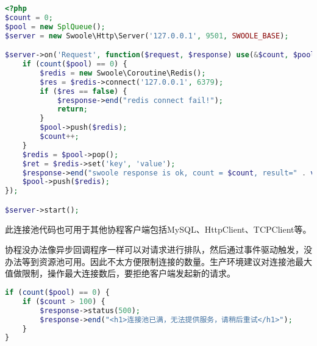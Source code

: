 \begin{lstlisting}[language=PHP]
<?php
$count = 0;
$pool = new SplQueue();
$server = new Swoole\Http\Server('127.0.0.1', 9501, SWOOLE_BASE);

$server->on('Request', function($request, $response) use(&$count, $pool) {
    if (count($pool) == 0) {
        $redis = new Swoole\Coroutine\Redis();
        $res = $redis->connect('127.0.0.1', 6379);
        if ($res == false) {
            $response->end("redis connect fail!");
            return;
        }
        $pool->push($redis);
        $count++;
    }
    $redis = $pool->pop();
    $ret = $redis->set('key', 'value');
    $response->end("swoole response is ok, count = $count, result=" . var_export($ret, true));
    $pool->push($redis);
});

$server->start();
\end{lstlisting}

此连接池代码也可用于其他协程客户端包括MySQL、HttpClient、TCPClient等。

协程没办法像异步回调程序一样可以对请求进行排队，然后通过事件驱动触发，没办法等到资源池可用。因此不太方便限制连接的数量。生产环境建议对连接池最大值做限制，操作最大连接数后，要拒绝客户端发起新的请求。


\begin{lstlisting}[language=PHP]
if (count($pool) == 0) {
    if ($count > 100) {
        $response->status(500);
        $response->end("<h1>连接池已满，无法提供服务，请稍后重试</h1>");
    }
}
\end{lstlisting}




\begin{lstlisting}[language=PHP]

\end{lstlisting}




\begin{lstlisting}[language=PHP]

\end{lstlisting}